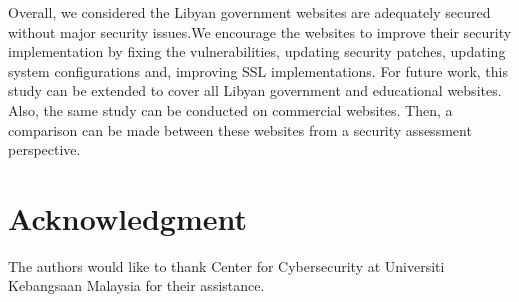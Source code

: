 \documentclass[conference]{IEEEtran}
\begin{document}
Overall, we considered the Libyan government websites are adequately
secured without major security issues.We encourage the
websites to improve their security implementation by fixing the
vulnerabilities, updating security patches, updating system
configurations and, improving SSL implementations. For future work, this study can be extended to cover all Libyan
government and educational websites. Also, the same study can be
conducted on commercial websites. Then, a comparison can be made
between these websites from a security assessment perspective.






\section*{Acknowledgment}


The authors would like to thank Center for Cybersecurity at Universiti
Kebangsaan Malaysia for their assistance.







%
%
%
%
%
%
%
\end{document}
